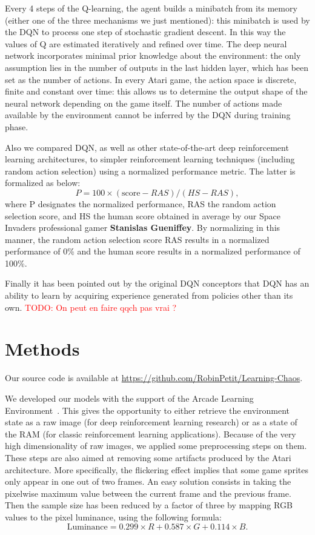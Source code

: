 \documentclass[letterpaper]{article}
\newcommand\todo[1]{\textcolor{red}{TODO: #1}}
\begin{document}
Every 4 steps of the Q-learning, the agent builds a minibatch from its memory (either one of the three mechanisms we just mentioned):
this minibatch is used by the DQN to process one step of stochastic gradient descent. In this way the values of Q are estimated iteratively and
refined over time. The deep neural network incorporates minimal prior knowledge about the environment: the only assumption lies in the number of
outputs in the last hidden layer, which has been set as the number of actions. In every Atari game, the action space is discrete, finite and constant over time:
this allows us to determine the output shape of the neural network depending on the game itself. The number of actions made available by the environment
cannot be inferred by the DQN during training phase.

Also we compared DQN, as well as other state-of-the-art deep reinforcement learning architectures, to simpler reinforcement learning techniques (including
random action selection) using a normalized performance metric. The latter is formalized as below:
\begin{equation}
    P = 100 \times (\text{score} - RAS) / (HS - RAS),
\end{equation}
where P designates the normalized performance, RAS the random action selection score, and HS the human score obtained in average by our
Space Invaders professional gamer \textbf{Stanislas Gueniffey}. By normalizing in this manner, the random action selection score RAS results in
a normalized performance of 0\% and the human score results in a normalized performance of 100\%.

Finally it has been pointed out by the original DQN conceptors that DQN has an ability to learn by acquiring experience generated from policies
other than its own. \todo{On peut en faire qqch pas vrai ?}

\section{Methods}

Our source code is available at \url{https://github.com/RobinPetit/Learning-Chaos}.

We developed our models with the support of the Arcade Learning Environment~\citep{bellemare13arcade}. This gives the opportunity to either
retrieve the environment state as a raw image (for deep reinforcement learning research) or as a state of the RAM (for classic reinforcement learning
applications). Because of the very high dimensionality of raw images, we applied some preprocessing steps on them. These steps are also aimed at
removing some artifacts produced by the Atari architecture. More specifically, the flickering effect implies that some game sprites only appear
in one out of two frames. An easy solution consists in taking the pixelwise maximum value between the current frame and the previous frame.
Then the sample size has been reduced by a factor of three by mapping RGB values to the pixel luminance, using the following formula:
\begin{equation}
    \text{Luminance} = 0.299 \times R + 0.587 \times G + 0.114 \times B.
\end{equation}
\end{document}
